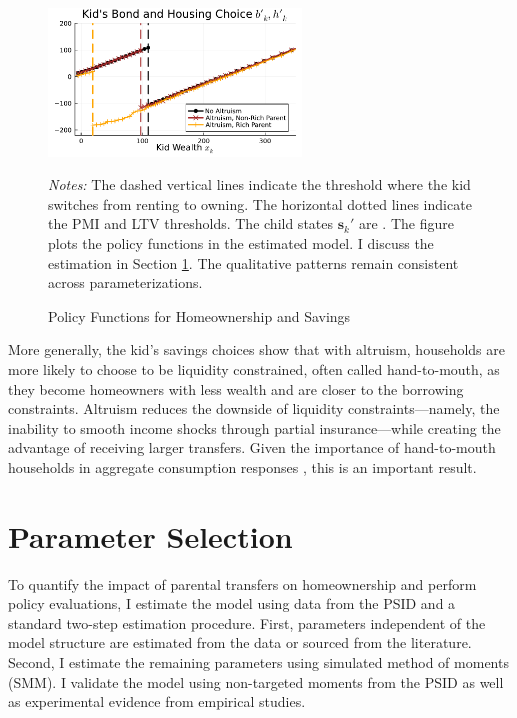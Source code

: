 \documentclass[12pt]{article}
\begin{document}
\begin{figure}\caption{Policy Functions for Homeownership and Savings}\label{fig:pol}
	\begin{center} 
	\includegraphics[width=0.6\textwidth]{../tabfig/model/pol_bond.pdf}
	\end{center}
	{\begin{footnotesize} \textit{Notes:} The dashed vertical lines indicate the threshold where the kid switches from renting to owning. The horizontal dotted lines indicate the PMI and LTV thresholds. The child states $\mathbf{s}_k'$ are \unskip. The figure plots the policy functions in the estimated model. I discuss the estimation in Section \ref{sec:estimation}. The qualitative patterns remain consistent across parameterizations. \end{footnotesize}}
\end{figure}

More generally, the kid's savings choices show that with altruism, households are more likely to choose to be liquidity constrained, often called hand-to-mouth, as they become homeowners with less wealth and are closer to the borrowing constraints. Altruism reduces the downside of liquidity constraints---namely, the inability to smooth income shocks through partial insurance---while creating the advantage of receiving larger transfers. Given the importance of hand-to-mouth households in aggregate consumption responses \citep[see, e.g.,][]{Kaplan2014a,Boar2020}, this is an important result.

\section{Parameter Selection}\label{sec:estimation}
To quantify the impact of parental transfers on homeownership and perform policy evaluations, I estimate the model using data from the PSID and a standard two-step estimation procedure. First, parameters independent of the model structure are estimated from the data or sourced from the literature. Second, I estimate the remaining parameters using simulated method of moments (SMM). I validate the model using non-targeted moments from the PSID as well as experimental evidence from empirical studies. 
\end{document}
